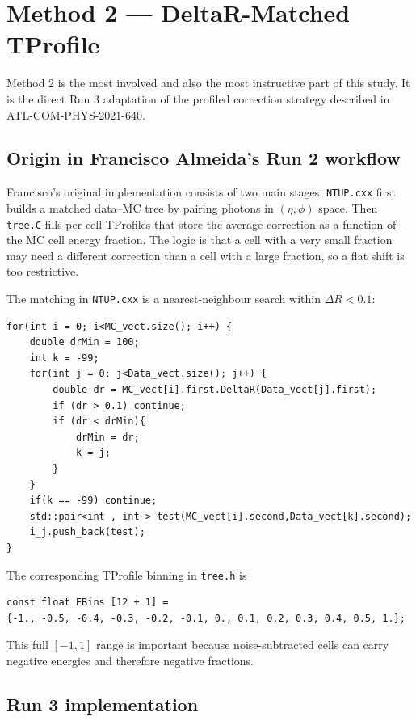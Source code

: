\documentclass[11pt,a4paper]{article}
\begin{document}
\section{Method 2 --- DeltaR-Matched TProfile}

Method 2 is the most involved and also the most instructive part of this study.
It is the direct Run 3 adaptation of the profiled correction strategy described
in ATL-COM-PHYS-2021-640.

\subsection{Origin in Francisco Almeida's Run 2 workflow}

Francisco's original implementation consists of two main stages.
\texttt{NTUP.cxx} first builds a matched data--MC tree by pairing photons in
$(\eta,\phi)$ space. Then \texttt{tree.C} fills per-cell TProfiles that store
the average correction as a function of the MC cell energy fraction. The logic
is that a cell with a very small fraction may need a different correction than a
cell with a large fraction, so a flat shift is too restrictive.

The matching in \texttt{NTUP.cxx} is a nearest-neighbour search within
$\Delta R < 0.1$:

\begin{lstlisting}
for(int i = 0; i<MC_vect.size(); i++) {
    double drMin = 100;
    int k = -99;
    for(int j = 0; j<Data_vect.size(); j++) {
        double dr = MC_vect[i].first.DeltaR(Data_vect[j].first);
        if (dr > 0.1) continue;
        if (dr < drMin){
            drMin = dr;
            k = j;
        }
    }
    if(k == -99) continue;
    std::pair<int , int > test(MC_vect[i].second,Data_vect[k].second);
    i_j.push_back(test);
}
\end{lstlisting}

The corresponding TProfile binning in \texttt{tree.h} is

\begin{lstlisting}
const float EBins [12 + 1] =
{-1., -0.5, -0.4, -0.3, -0.2, -0.1, 0., 0.1, 0.2, 0.3, 0.4, 0.5, 1.};
\end{lstlisting}

This full $[-1,1]$ range is important because noise-subtracted cells can carry
negative energies and therefore negative fractions.

\subsection{Run 3 implementation}
\end{document}
